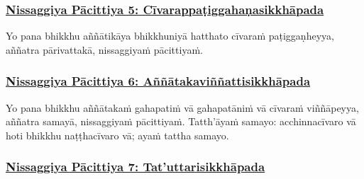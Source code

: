 \subsubsection*{\hyperref[forf-exp5]{Nissaggiya Pācittiya 5: Cīvarappaṭiggahaṇasikkhāpada}}
\label{np5}

Yo pana bhikkhu aññātikāya\makeatletter\hyperlink{endnote131-appendix}\makeatother{} bhikkhuniyā hatthato cīvaraṁ paṭiggaṇheyya,\makeatletter\hyperlink{endnote132-appendix}\makeatother{} aññatra pārivattakā,\makeatletter\hyperlink{endnote133-appendix}\makeatother{} nissaggiyaṁ pācittiyaṁ.



\subsubsection*{\hyperref[forf-exp6]{Nissaggiya Pācittiya 6: Aññātakaviññattisikkhāpada}}
\label{np6}

Yo pana bhikkhu aññātakaṁ\makeatletter\hyperlink{endnote134-appendix}\makeatother{} gahapatiṁ vā gahapatāniṁ vā cīvaraṁ viññāpeyya, aññatra samayā, nissaggiyaṁ pācittiyaṁ. Tatth'āyaṁ samayo: acchinnacīvaro vā hoti bhikkhu naṭṭhacīvaro vā; ayaṁ tattha samayo.



\subsubsection*{\hyperref[forf-exp7]{Nissaggiya Pācittiya 7: Tat'uttarisikkhāpada}}
\label{np7}


